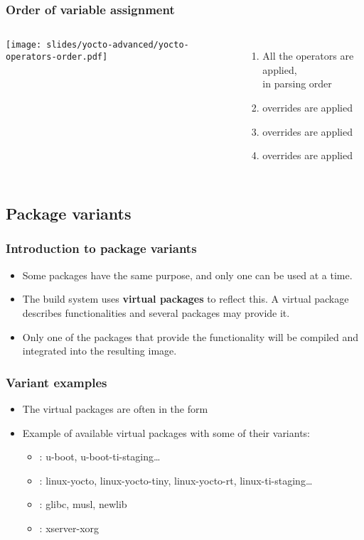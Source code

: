 \begin{frame}
  \frametitle{Order of variable assignment}
  \begin{columns}
      \texttt{[image: slides/yocto-advanced/yocto-operators-order.pdf]}
      \begin{enumerate}
        \item All the operators are applied,\\
          in parsing order
        \item {} overrides are applied
        \item {} overrides are applied
        \item {} overrides are applied
      \end{enumerate}
  \end{columns}
\end{frame}


\subsection{Package variants}

\begin{frame}
  \frametitle{Introduction to package variants}
  \begin{itemize}
    \item Some packages have the same purpose, and only one can be
      used at a time.
    \item The build system uses {\bf virtual packages} to reflect
      this. A virtual package describes functionalities and several
      packages may provide it.
    \item Only one of the packages that provide the functionality will
    be compiled and integrated into the resulting image.
  \end{itemize}
\end{frame}

\begin{frame}
  \frametitle{Variant examples}
  \begin{itemize}
    \item The virtual packages are often in the form
    \item Example of available virtual packages with some of their
      variants:
      \begin{itemize}
        \item {}: u-boot,
          u-boot-ti-staging\dots
        \item {}: linux-yocto, linux-yocto-tiny,
          linux-yocto-rt, linux-ti-staging\dots
        \item {}: glibc, musl, newlib
        \item {}: xserver-xorg
      \end{itemize}
  \end{itemize}
\end{frame}

